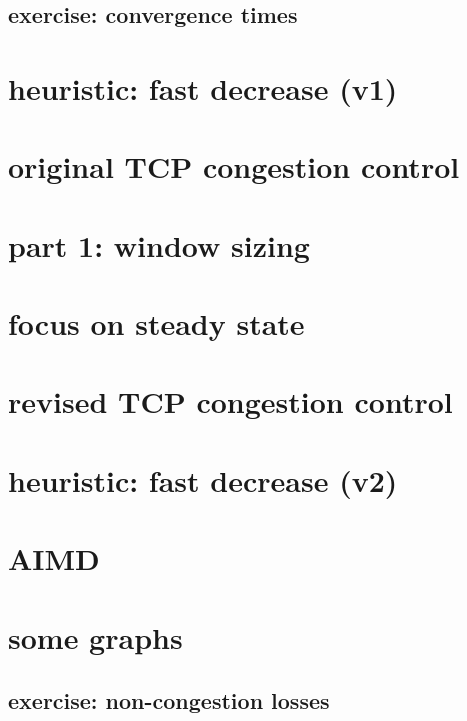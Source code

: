 \subsection{exercise: convergence times}


\section{heuristic: fast decrease (v1)}


\section{original TCP congestion control}


\section{part 1: window sizing}

\section{focus on steady state}


\section{revised TCP congestion control}


\section{heuristic: fast decrease (v2)}


\section{AIMD}



\section{some graphs}



\subsection{exercise: non-congestion losses} %



